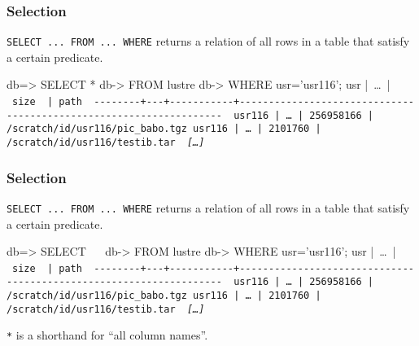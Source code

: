 \documentclass[english,serif,mathserif]{beamer}
\begin{document}
\begin{frame}[fragile]
  \frametitle{Selection}

  \texttt{SELECT ... FROM ... WHERE} returns a relation of all rows in a table
  that satisfy a certain predicate.

  \+
\begin{sql}[basicstyle=\ttfamily\tiny]
db=> SELECT *
db-> FROM lustre
db-> WHERE usr='usr116';
  usr   |~\ldots~|   ~\tt size~    | path
~-{}-{}-{}-{}-{}-{}-{}-{}+{}-{}-{}-{}+{}-{}-{}-{}-{}-{}-{}-{}-{}-{}-{}-{}+{}-{}-{}-{}-{}-{}-{}-{}-{}-{}-{}-{}-{}-{}-{}-{}-{}-{}-{}-{}-{}-{}-{}-{}-{}-{}-{}-{}-{}-{}-{}-{}-{}-{}-{}-{}-{}-{}-{}-{}-{}-{}-{}-{}-{}-{}-{}-{}-{}-{}-{}-{}-{}-{}-{}-{}-{}-{}-{}-{}-{}-{}-{}-{}-{}-{}-{}-{}~
 usr116 |~\ldots~| 256958166 | /scratch/id/usr116/pic_babo.tgz
 usr116 |~\ldots~|   2101760 | /scratch/id/usr116/testib.tar
 ~{\em [\ldots]}~
\end{sql}
\end{frame}


\begin{frame}[fragile]
  \frametitle{Selection}

  \texttt{SELECT ... FROM ... WHERE} returns a relation of all rows in a table
  that satisfy a certain predicate.

  \+
\begin{sql}[basicstyle=\ttfamily\tiny]
db=> SELECT ~\HL{*}~
db-> FROM lustre
db-> WHERE usr='usr116';
  usr   |~\ldots~|   ~\tt size~    | path
~-{}-{}-{}-{}-{}-{}-{}-{}+{}-{}-{}-{}+{}-{}-{}-{}-{}-{}-{}-{}-{}-{}-{}-{}+{}-{}-{}-{}-{}-{}-{}-{}-{}-{}-{}-{}-{}-{}-{}-{}-{}-{}-{}-{}-{}-{}-{}-{}-{}-{}-{}-{}-{}-{}-{}-{}-{}-{}-{}-{}-{}-{}-{}-{}-{}-{}-{}-{}-{}-{}-{}-{}-{}-{}-{}-{}-{}-{}-{}-{}-{}-{}-{}-{}-{}-{}-{}-{}-{}-{}-{}-{}~
 usr116 |~\ldots~| 256958166 | /scratch/id/usr116/pic_babo.tgz
 usr116 |~\ldots~|   2101760 | /scratch/id/usr116/testib.tar
 ~{\em [\ldots]}~
\end{sql}

  \texttt{*} is a shorthand for ``all column names''.
\end{frame}
\end{document}
